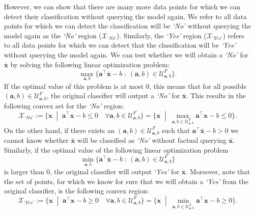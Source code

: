 \documentclass{article}
\begin{document}
However, we can show that there are many more data points for which we can detect their classification without querying the model again. We refer to all data points for which we can detect the classification will be \textit{`No'} without querying the model again as the \textit{`No'} region ($\mathcal{X}_{\textit{`No'}}$). Similarly, the \textit{`Yes'} region ($\mathcal{X}_{\textit{`Yes'}}$) refers to all data points for which we can detect that the classification will be \textit{`Yes'} without querying the model again. We can test whether we will obtain a \textit{`No'} for $\bar{\bm{x}}$ by solving the following linear optimization problem:
\begin{equation*} \max_{\bm{a},b} \{ \bm{a}^{\top}\bar{\bm{x}} -b\; : \: (\bm{a},b) \in \mathcal{U}_{\bm{a},b}^F  \}.\label{eq:no-rgn}
\end{equation*} 
If the optimal value of this problem is at most $0$, this means that for all possible $(\bm{a},b)\in \mathcal{U}_{\bm{a},b}^F$, the original classifier will output a \textit{`No'} for $\bar{\bm{x}}$. This results in the following convex set for the \textit{`No'} region:
\begin{equation}
  \mathcal{X}_{\textit{`No'}}:=\{ \bm{x}  \;\; | \;\;  \bm{a}^{\top}\bm{x} - b \leq 0 \quad \forall \bm{a},b\in \mathcal{U}_{\bm{a},b}^F \}=\{ \bm{x}  \;\; | \;\;  \max_{\bm{a},b\in \mathcal{U}_{\bm{a},b}^F}\bm{a}^{\top}\bm{x} - b \leq 0  \}.\label{eq:no-rgn-opt}
\end{equation}
On the other hand, if there exists an $(\bm{a},b) \in \mathcal{U}_{\bm{a},b}^F$ such that $\bm{a}^{\top}\bar{\bm{x}} -b> 0$ we cannot know whether $\bar{\bm{x}}$ will be classified as \textit{`No'} without factual querying $\bar{\bm{x}}$.
Similarly, if the optimal value of the following linear optimization problem
\begin{equation*}
    \min_{\bm{a},b} \{ \bm{a}^{\top}\bar{\bm x} -b\; : \: (\bm{a},b) \in \mathcal{U}_{\bm{a},b}^F  \}\label{eq:yes-rgn}
\end{equation*} 
is larger than $0$, the original classifier will output \textit{`Yes'} for $\bar{\bm x}$. Moreover, note that the set of points, for which we know for sure that we will obtain a \textit{`Yes'} from the original classifier, is the following convex region: 
\begin{equation}
  \mathcal{X}_{\textit{`Yes'}}:=\{ \bm{x}  \;\; | \;\;  \bm{a}^{\top}\bm{x} - b \geq 0 \quad \forall \bm{a},b\in \mathcal{U}_{\bm{a},b}^F \}=\{ \bm{x}  \;\; | \;\;  \min_{\bm{a},b\in \mathcal{U}_{\bm{a},b}^F}\bm{a}^{\top}\bm{x} - b \geq 0  \}.\label{eq:yes-rgn-opt}
\end{equation}
\end{document}
